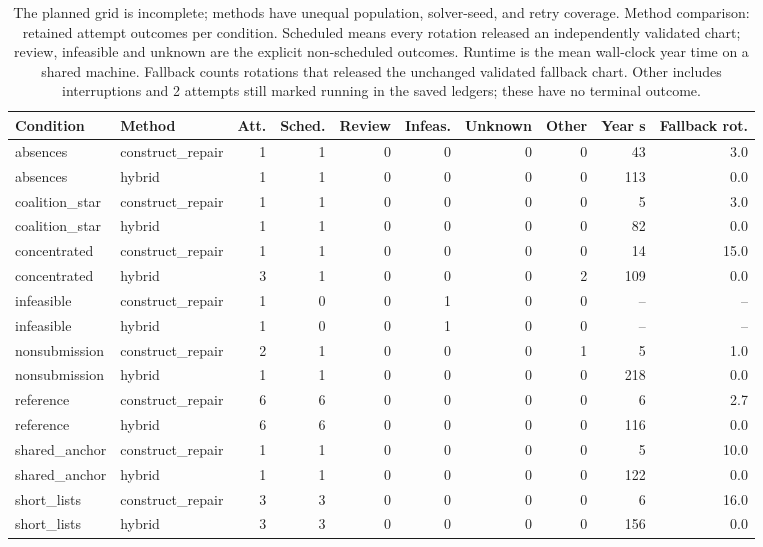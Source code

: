 \begin{table}[tb]\centering\scriptsize\setlength{\tabcolsep}{4pt}
\caption{The planned grid is incomplete; methods have unequal population, solver-seed, and retry coverage. Method comparison: retained attempt outcomes per condition. Scheduled means every rotation released an independently validated chart; review, infeasible and unknown are the explicit non-scheduled outcomes. Runtime is the mean wall-clock year time on a shared machine. Fallback counts rotations that released the unchanged validated fallback chart. Other includes interruptions and 2 attempts still marked running in the saved ledgers; these have no terminal outcome.}\label{tab:evalOutcomes}
\begin{tabular}{@{}llrrrrrrrr@{}}\toprule
Condition & Method & Att. & Sched. & Review & Infeas. & Unknown & Other & Year s & Fallback rot. \\ \midrule
absences & construct\_repair & 1 & 1 & 0 & 0 & 0 & 0 & 43 & 3.0 \\
absences & hybrid & 1 & 1 & 0 & 0 & 0 & 0 & 113 & 0.0 \\
coalition\_star & construct\_repair & 1 & 1 & 0 & 0 & 0 & 0 & 5 & 3.0 \\
coalition\_star & hybrid & 1 & 1 & 0 & 0 & 0 & 0 & 82 & 0.0 \\
concentrated & construct\_repair & 1 & 1 & 0 & 0 & 0 & 0 & 14 & 15.0 \\
concentrated & hybrid & 3 & 1 & 0 & 0 & 0 & 2 & 109 & 0.0 \\
infeasible & construct\_repair & 1 & 0 & 0 & 1 & 0 & 0 & -- & -- \\
infeasible & hybrid & 1 & 0 & 0 & 1 & 0 & 0 & -- & -- \\
nonsubmission & construct\_repair & 2 & 1 & 0 & 0 & 0 & 1 & 5 & 1.0 \\
nonsubmission & hybrid & 1 & 1 & 0 & 0 & 0 & 0 & 218 & 0.0 \\
reference & construct\_repair & 6 & 6 & 0 & 0 & 0 & 0 & 6 & 2.7 \\
reference & hybrid & 6 & 6 & 0 & 0 & 0 & 0 & 116 & 0.0 \\
shared\_anchor & construct\_repair & 1 & 1 & 0 & 0 & 0 & 0 & 5 & 10.0 \\
shared\_anchor & hybrid & 1 & 1 & 0 & 0 & 0 & 0 & 122 & 0.0 \\
short\_lists & construct\_repair & 3 & 3 & 0 & 0 & 0 & 0 & 6 & 16.0 \\
short\_lists & hybrid & 3 & 3 & 0 & 0 & 0 & 0 & 156 & 0.0 \\

\end{tabular}
\end{table}
